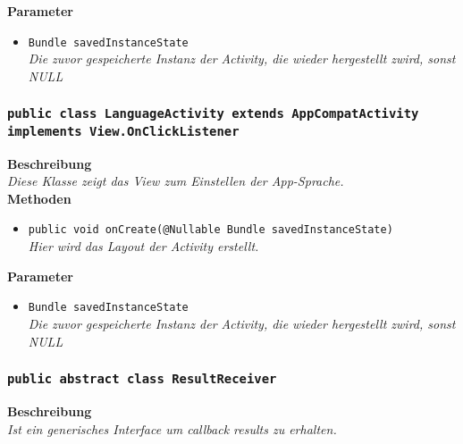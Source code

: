                 \textbf{Parameter}
                \begin{itemize}
        		\item\texttt{Bundle savedInstanceState}\\  
                \textit{Die zuvor gespeicherte Instanz der Activity, die wieder hergestellt zwird, sonst NULL}\\
                \end{itemize} 
               
       \subsubsection{\texttt{public class LanguageActivity extends AppCompatActivity implements View.OnClickListener}}
               
               	\textbf{Beschreibung} \\
      	        \textit{Diese Klasse zeigt das View zum Einstellen der App-Sprache.} \\
                
                \textbf{Methoden}
                \begin{itemize}
        		\item\texttt{{public void onCreate(@Nullable Bundle savedInstanceState)}}\\
                \textit{Hier wird das Layout der Activity erstellt.}\\
                \end{itemize}
                
                \textbf{Parameter}
                \begin{itemize}
        		\item\texttt{Bundle savedInstanceState}\\  
                \textit{Die zuvor gespeicherte Instanz der Activity, die wieder hergestellt zwird, sonst NULL}\\
                \end{itemize} 
        
        \subsubsection{\texttt{public abstract class ResultReceiver}}
               
               	\textbf{Beschreibung} \\
      	        \textit{Ist ein generisches Interface um callback results zu erhalten.} \\
               

